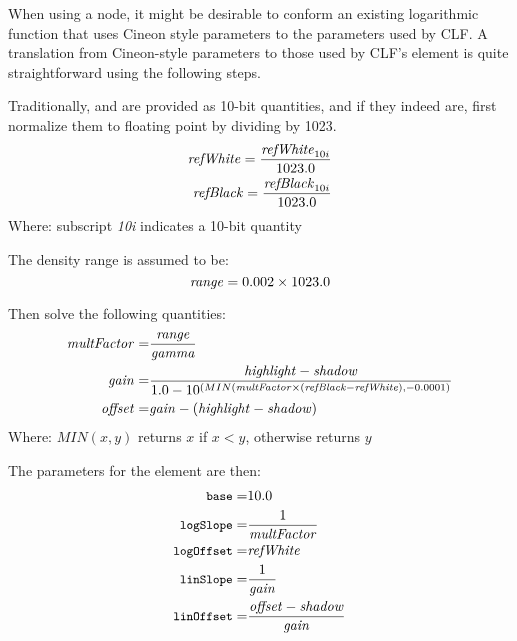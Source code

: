 \label{appendix:cineon-log}

When using a  node, it might be desirable to conform an existing logarithmic function that uses Cineon style parameters to the parameters used by CLF. A translation from Cineon-style parameters to those used by CLF's  element is quite straightforward using the following steps.

Traditionally,  and  are provided as 10-bit quantities, and if they indeed are, first normalize them to floating point by dividing by 1023.
\begin{align}
    \text{\emph{refWhite}} = \frac{\text{\emph{refWhite}}_{10i}}{1023.0} \\
    \text{\emph{refBlack}} = \frac{\text{\emph{refBlack}}_{10i}}{1023.0}        
\end{align}
\tabto{0.5in} Where:
\tabto{0.75in} subscript \emph{10i} indicates a 10-bit quantity

The density range is assumed to be:
\begin{equation}
    \text{\emph{range}} = 0.002 \times 1023.0
\end{equation}

Then solve the following quantities:
\begin{align}
    \text{\emph{multFactor}} =& \frac{\text{\emph{range}}}{\text{\emph{gamma}}} \\
    \text{\emph{gain}} =& \frac{\text{\emph{highlight}} - \text{\emph{shadow}}}{1.0 - 10^{( MIN( \text{\emph{multFactor}} \times (\text{\emph{refBlack}}-\text{\emph{refWhite}}), -0.0001)}} \\
    \text{\emph{offset}} =& \text{\emph{gain}} - (\text{\emph{highlight}} - \text{\emph{shadow}}) \\
\end{align}
\tabto{0.5in} Where:
\tabto{0.75in} $MIN(x,y)$ returns $x$ if $x<y$, otherwise returns $y$

The parameters for the  element are then:
\begin{align}
    {\small \texttt{base}} =& 10.0 \\
    {\small \texttt{logSlope}} =& \frac{1}{\text{\emph{multFactor}}} \\
    {\small \texttt{logOffset}} =& \text{\emph{refWhite}} \\
    {\small \texttt{linSlope}} =& \frac{1}{\text{\emph{gain}}} \\
    {\small \texttt{linOffset}} =& \frac{\text{\emph{offset}}-\text{\emph{shadow}}}{\text{\emph{gain}}}
\end{align}